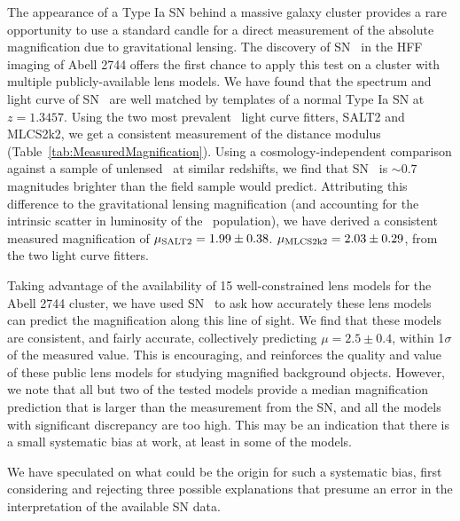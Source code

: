 The appearance of a Type Ia SN behind a massive galaxy cluster
provides a rare opportunity to use a standard candle for a direct
measurement of the absolute magnification due to gravitational
lensing.  The discovery of SN \tomas\ in the HFF imaging of Abell 2744
offers the first chance to apply this test on a cluster with multiple
publicly-available lens models.  We have found that the spectrum and
light curve of SN \tomas\ are well matched by templates of a normal
Type Ia SN at $z=1.3457$.  Using the two most prevalent \SNIa\ light
curve fitters, SALT2 and MLCS2k2, we get a consistent measurement of
the distance modulus (Table~\ref{tab:MeasuredMagnification}).  Using a
cosmology-independent comparison against a sample of unlensed \SNeIa\
at similar redshifts, we find that SN \tomas\ is $\sim0.7$ magnitudes
brighter than the field sample would predict.  Attributing this
difference to the gravitational lensing magnification (and accounting
for the intrinsic scatter in luminosity of the \SNIa\ population), we
have derived a consistent measured magnification of $\mu_{\rm
SALT2}=1.99\pm0.38$.  $\mu_{\rm MLCS2k2}=2.03\pm0.29$, from the two
light curve fitters.

Taking advantage of the availability of 15 well-constrained lens
models for the Abell 2744 cluster, we have used SN \tomas\ to ask how
accurately these lens models can predict the magnification along this
line of sight.  We find that these models are consistent, and fairly
accurate, collectively predicting $\mu=2.5\pm0.4$, within 1$\sigma$ of
the measured value.  This is encouraging, and reinforces the quality
and value of these public lens models for studying magnified
background objects.  However, we note that all but two of the tested
models provide a median magnification prediction that is larger than
the measurement from the SN, and all the models with significant
discrepancy are too high.  This may be an indication that there is a
small systematic bias at work, at least in some of the models. 

We have speculated on what could be the origin for such a systematic
bias, first considering and rejecting three possible explanations that
presume an error in the interpretation of the available SN data.


